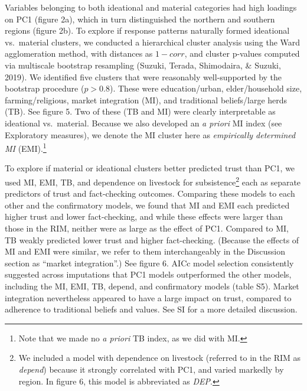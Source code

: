\documentclass[
  11pt,
]{article}
\begin{document}
Variables belonging to both ideational and material categories had high
loadings on PC1 (figure 2a), which in turn distinguished the northern
and southern regions (figure 2b). To explore if response patterns
naturally formed ideational vs.~material clusters, we conducted a
hierarchical cluster analysis using the Ward agglomeration method, with
distances as \(1-corr\), and cluster p-values computed via multiscale
bootstrap resampling (Suzuki, Terada, Shimodaira, \& Suzuki, 2019). We
identified five clusters that were reasonably well-supported by the
bootstrap procedure (\(p > 0.8\)). These were education/urban,
elder/household size, farming/religious, market integration (MI), and
traditional beliefs/large herds (TB). See figure 5. Two of these (TB and
MI) were clearly interpretable as ideational vs.~material. Because we
also developed an \emph{a priori} MI index (see Exploratory measures),
we denote the MI cluster here as \emph{empirically determined MI}
(EMI).\footnote{Note that we made no \emph{a priori} TB index, as we did with MI.}

To explore if material or ideational clusters better predicted trust
than PC1, we used MI, EMI, TB, and dependence on livestock for
subsistence\footnote{We included a model with dependence on livestock (referred to in the RIM as \emph{depend}) because it strongly correlated with PC1, and varied markedly by region. In figure 6, this model is abbreviated as \emph{DEP}.}
each as separate predictors of trust and fact-checking outcomes.
Comparing these models to each other and the confirmatory models, we
found that MI and EMI each predicted higher trust and lower
fact-checking, and while these effects were larger than those in the
RIM, neither were as large as the effect of PC1. Compared to MI, TB
weakly predicted lower trust and higher fact-checking. (Because the
effects of MI and EMI were similar, we refer to them interchangeably in
the Discussion section as ``market integration''.) See figure 6. AICc
model selection consistently suggested across imputations that PC1
models outperformed the other models, including the MI, EMI, TB, depend,
and confirmatory models (table S5). Market integration nevertheless
appeared to have a large impact on trust, compared to adherence to
traditional beliefs and values. See SI for a more detailed discussion.
\end{document}

